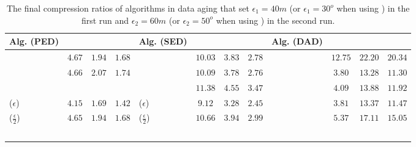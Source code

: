    	 	 
\begin{table}
	\caption{\small The final compression ratios of algorithms in data aging that set $\epsilon_1=40m$ (or $\epsilon_1=30^o$ when using \dad) in the first run and $\epsilon_2=60m$ (or $\epsilon_2=50^o$ when using \dad) in the second run.}
	\centering
	\scriptsize
	\vspace{-1ex}
	\begin{tabular}{|l|c|c|c|l|c|c|c|l|c|c|c|}
		\hline
		\bf{Alg. (PED)}  &\ucar &\geolife &\mopsi & \bf{Alg. (SED)}  &\ucar &\geolife &\mopsi &\bf{Alg. (DAD)}  &\ucar &\geolife &\mopsi \\
		\hline  		 
		{\dpa} &	$4.67$ & $1.94 $ &	$1.68$	&\dpa &$10.03$ &$3.83$ & $2.78 $ & \dpa	& $12.75$	& $22.20$	& $20.34 $ \\
		\hline
		{\tpa} &	$4.66$ & $	2.07 $ &	$1.74 $	&\tpa 	& $10.09$& $3.78$ &$2.76$ & \tpa	& $3.80$	& $13.28$	& $11.30$ \\
		\hline
		{\bqsa} &	$ $ & $ $ &	$  $	&\squishe &$11.38$ &$4.55$ & $3.47$ & \opwa	& $4.09$	& $13.88$	& $11.92$ \\
		\hline
		{\siped($\epsilon$)} &	$4.15 $ & $1.69 $ &	$1.42$	&\cised($\epsilon$) & $9.12$ &$3.28$ &$2.45 $ & \interval	& $3.81$	& $13.37$	& $11.47 $ \\
		\hline
		{\siped($\frac{\epsilon}{2}$)} &	$4.65 $ & $1.94$ &	$1.68$ &\cised($\frac{\epsilon}{2}$) &$10.66 $ & $3.94$ & $2.99 $& \intersec	& $5.37$	& $17.11$	& $15.05 $ \\
		\hline
		{\operb} &	$ $ & $ $ &	$ $	& & & & & & & & \\
		\hline
	\end{tabular}
	\label{tab:aging-cr}	
	\vspace{-2ex}
\end{table}

 	 	 
   	 	 
